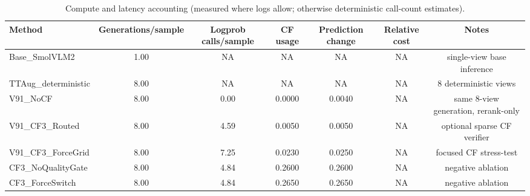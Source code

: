 \begin{table}[t]
\centering
\begin{tabular}{lcccccc}
\toprule
Method & Generations/sample & Logprob calls/sample & CF usage & Prediction change & Relative cost & Notes \\
\midrule
Base_SmolVLM2 & 1.00 & NA & NA & NA & NA & single-view base inference \\
TTAug_deterministic & 8.00 & NA & NA & NA & NA & 8 deterministic views \\
V91_NoCF & 8.00 & 0.00 & 0.0000 & 0.0040 & NA & same 8-view generation, rerank-only \\
V91_CF3_Routed & 8.00 & 4.59 & 0.0050 & 0.0050 & NA & optional sparse CF verifier \\
V91_CF3_ForceGrid & 8.00 & 7.25 & 0.0230 & 0.0250 & NA & focused CF stress-test \\
CF3_NoQualityGate & 8.00 & 4.84 & 0.2600 & 0.2600 & NA & negative ablation \\
CF3_ForceSwitch & 8.00 & 4.84 & 0.2650 & 0.2650 & NA & negative ablation \\
\bottomrule
\end{tabular}
\caption{Compute and latency accounting (measured where logs allow; otherwise deterministic call-count estimates).}
\label{tab:compute_cost}
\end{table}
